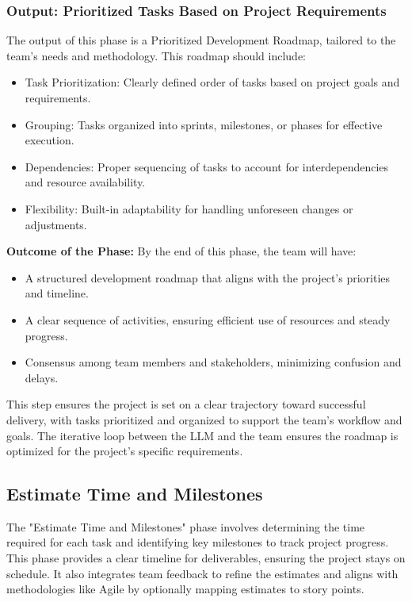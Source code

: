 \documentclass[14pt, a4paper]{article}
\begin{document}
\subsubsection{Output: Prioritized Tasks Based on Project Requirements}

The output of this phase is a Prioritized Development Roadmap, tailored to the
team’s needs and methodology. This roadmap should include:

\begin{itemize}
    \item Task Prioritization: Clearly defined order of tasks based on project
    goals and requirements.
    \item Grouping: Tasks organized into sprints, milestones, or phases for
    effective execution.
    \item Dependencies: Proper sequencing of tasks to account for
    interdependencies and resource availability.
    \item Flexibility: Built-in adaptability for handling unforeseen changes or
    adjustments.
\end{itemize}

\textbf{Outcome of the Phase:} By the end of this phase, the team will have:

\begin{itemize}
    \item A structured development roadmap that aligns with the project’s
    priorities and timeline.
    \item A clear sequence of activities, ensuring efficient use of resources
    and steady progress.
    \item Consensus among team members and stakeholders, minimizing confusion
    and delays.
\end{itemize}

This step ensures the project is set on a clear trajectory toward successful
delivery, with tasks prioritized and organized to support the team's workflow
and goals. The iterative loop between the LLM and the team ensures the roadmap
is optimized for the project’s specific requirements.

\subsection{Estimate Time and Milestones}

The "Estimate Time and Milestones" phase involves determining the time required
for each task and identifying key milestones to track project progress. This
phase provides a clear timeline for deliverables, ensuring the project stays on
schedule. It also integrates team feedback to refine the estimates and aligns
with methodologies like Agile by optionally mapping estimates to story points.
\end{document}
